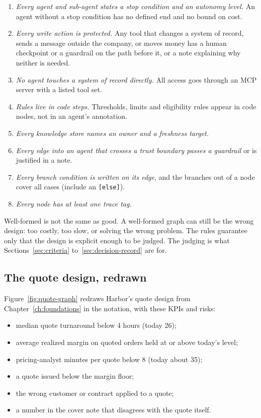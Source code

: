 \begin{enumerate}[label=\textbf{W\arabic*.},leftmargin=2.5em,itemsep=2pt]
  \item \emph{Every agent and sub-agent states a stop condition and an autonomy level.} An agent without a stop condition has no defined end and no bound on cost.
  \item \emph{Every write action is protected.} Any tool that changes a system of record, sends a message outside the company, or moves money has a human checkpoint or a guardrail on the path before it, or a note explaining why neither is needed.
  \item \emph{No agent touches a system of record directly.} All access goes through an MCP server with a listed tool set.
  \item \emph{Rules live in code steps.} Thresholds, limits and eligibility rules appear in code nodes, not in an agent's annotation.
  \item \emph{Every knowledge store names an owner and a freshness target.}
  \item \emph{Every edge into an agent that crosses a trust boundary passes a guardrail} or is justified in a note.
  \item \emph{Every branch condition is written on its edge}, and the branches out of a node cover all cases (include an \texttt{[else]}).
  \item \emph{Every node has at least one trace tag.}
\end{enumerate}

\begin{designnote}
Well-formed is not the same as good. A well-formed graph can still be the wrong design: too costly, too slow, or solving the wrong problem. The rules guarantee only that the design is explicit enough to be judged. The judging is what Sections~\ref{sec:criteria} to~\ref{sec:decision-record} are for.
\end{designnote}

\subsection{The quote design, redrawn}

Figure~\ref{fig:quote-graph} redraws Harbor's quote design from Chapter~\ref{ch:foundations} in the notation, with these KPIs and risks:
\begin{itemize}[itemsep=0pt]
  \item[\textsf{K1}] median quote turnaround below 4 hours (today 26);
  \item[\textsf{K2}] average realized margin on quoted orders held at or above today's level;
  \item[\textsf{K3}] pricing-analyst minutes per quote below 8 (today about 35);
  \item[\textsf{R1}] a quote issued below the margin floor;
  \item[\textsf{R2}] the wrong customer or contract applied to a quote;
  \item[\textsf{R3}] a number in the cover note that disagrees with the quote itself.
\end{itemize}

